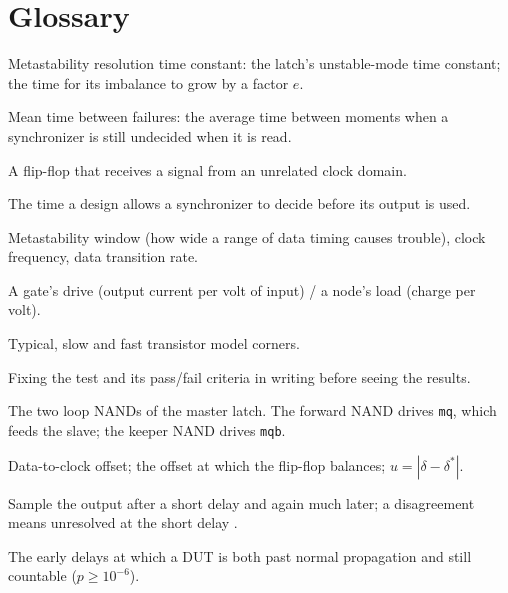 \documentclass[11pt]{article}
\begin{document}
\section{Glossary}
\begin{description}[leftmargin=0pt,style=nextline]
\item[$\tau$] Metastability resolution time constant: the latch's unstable-mode time constant; the time for its
imbalance to grow by a factor $e$.
\item[MTBF] Mean time between failures: the average time between moments when a synchronizer is still undecided when it is read.
\item[synchronizer] A flip-flop that receives a signal from an unrelated clock domain.
\item[settling time $S$] The time a design allows a synchronizer to decide before its output is used.
\item[$T_W$, $f_C$, $f_D$] Metastability window (how wide a range of data timing causes trouble), clock frequency, data transition rate.
\item[transconductance $g$ / capacitance $C$] A gate's drive (output current per volt of input) / a node's load (charge per volt).
\item[TT, SS, FF] Typical, slow and fast transistor model corners.
\item[pre-registration] Fixing the test and its pass/fail criteria in writing before seeing the results.
\item[forward / keeper] The two loop NANDs of the master latch. The forward NAND drives \texttt{mq}, which feeds the slave; the keeper NAND drives \texttt{mqb}.
\item[$\delta$, $\delta^*$, $u$] Data-to-clock offset; the offset at which the flip-flop balances; $u=|\delta-\delta^*|$.
\item[early/late method] Sample the output after a short delay and again much later; a disagreement means unresolved at the short delay \cite{beer2011}.
\item[code window] The early delays at which a DUT is both past normal propagation and still countable ($p\ge10^{-6}$).
\end{description}
\end{document}
